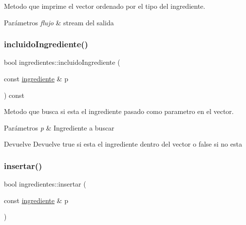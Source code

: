 Metodo que imprime el vector ordenado por el tipo del ingrediente. 


\begin{DoxyParams}{Parámetros}
{\em flujo} & stream del salida \\
\hline
\end{DoxyParams}
\mbox{\label{classingredientes_a6d3f30e2e79299a970c705f61a8ee4d7}} 
\subsubsection{\texorpdfstring{incluido\+Ingrediente()}{incluidoIngrediente()}}
{\footnotesize\ttfamily bool ingredientes\+::incluido\+Ingrediente (\begin{DoxyParamCaption}\item[{const \hyperlink{classingrediente}{ingrediente} \&}]{p }\end{DoxyParamCaption}) const}



Metodo que busca si esta el ingrediente pasado como parametro en el vector. 


\begin{DoxyParams}{Parámetros}
{\em p} & Ingrediente a buscar \\
\hline
\end{DoxyParams}
\begin{DoxyReturn}{Devuelve}
Devuelve true si esta el ingrediente dentro del vector o false si no esta 
\end{DoxyReturn}
\mbox{\label{classingredientes_a7633d03cdda31180994b63090ff9dd11}} 
\subsubsection{\texorpdfstring{insertar()}{insertar()}}
{\footnotesize\ttfamily bool ingredientes\+::insertar (\begin{DoxyParamCaption}\item[{const \hyperlink{classingrediente}{ingrediente} \&}]{p }\end{DoxyParamCaption})}



